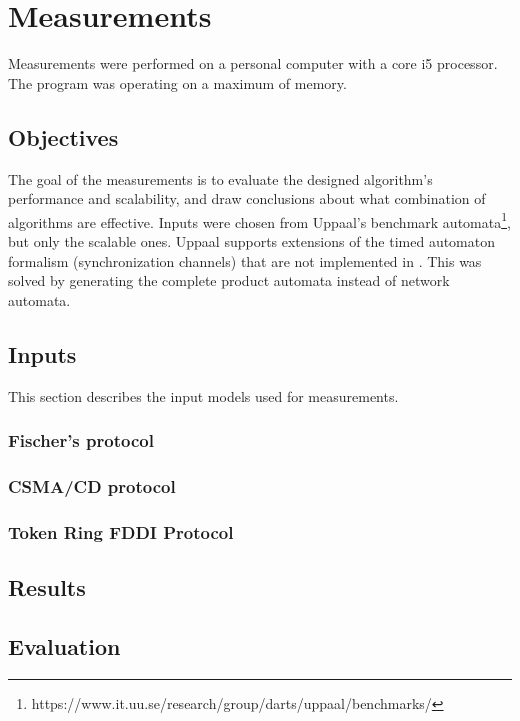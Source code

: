 \section{Measurements}

Measurements were performed on a personal computer with a core i5 processor. The program was operating on a maximum of   memory.

\subsection{Objectives}

The goal of the measurements is to evaluate the designed algorithm's performance and scalability, and draw conclusions about what combination of algorithms are effective. Inputs were chosen from Uppaal's benchmark automata\footnote{https://www.it.uu.se/research/group/darts/uppaal/benchmarks/}, but only the scalable ones. Uppaal supports extensions of the timed automaton formalism (synchronization channels) that are not implemented in \ttmc. This was solved by generating the complete product automata instead of network automata.



\subsection{Inputs}

This section describes the input models used for measurements.

\subsubsection{Fischer's protocol}

\subsubsection{CSMA/CD protocol}

\subsubsection{Token Ring FDDI Protocol}



\subsection{Results}

\subsection{Evaluation}


